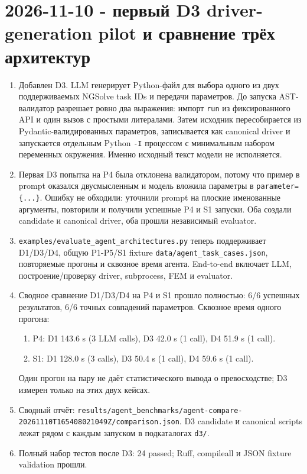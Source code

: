 \documentclass[11pt,a4paper]{article}
\begin{document}
\section{2026-11-10 - первый D3 driver-generation pilot и сравнение трёх архитектур}

\begin{enumerate}
    \item Добавлен D3. LLM генерирует Python-файл для выбора одного из двух поддерживаемых NGSolve task IDs и передачи параметров. До запуска AST-валидатор разрешает ровно два выражения: импорт \texttt{run} из фиксированного API и один вызов с простыми литералами. Затем исходник пересобирается из Pydantic-валидированных параметров, записывается как canonical driver и запускается отдельным Python \texttt{-I} процессом с минимальным набором переменных окружения. Именно исходный текст модели не исполняется.
    \item Первая D3 попытка на P4 была отклонена валидатором, потому что пример в prompt оказался двусмысленным и модель вложила параметры в \texttt{parameter=\{...\}}. Ошибку не обходили: уточнили prompt на плоские именованные аргументы, повторили и получили успешные P4 и S1 запуски. Оба создали candidate и canonical driver, оба прошли независимый evaluator.
    \item \texttt{examples/evaluate\_agent\_architectures.py} теперь поддерживает D1/D3/D4, общую P1-P5/S1 fixture \texttt{data/agent\_task\_cases.json}, повторяемые прогоны и сквозное время агента. End-to-end включает LLM, построение/проверку driver, subprocess, FEM и evaluator.
    \item Сводное сравнение D1/D3/D4 на P4 и S1 прошло полностью: 6/6 успешных результатов, 6/6 точных совпадений параметров. Сквозное время одного прогона:
    \begin{enumerate}
        \item P4: D1 143.6 s (3 LLM calls), D3 42.0 s (1 call), D4 51.9 s (1 call).
        \item S1: D1 128.0 s (3 calls), D3 50.4 s (1 call), D4 59.6 s (1 call).
    \end{enumerate}
    Один прогон на пару не даёт статистического вывода о превосходстве; D3 измерен только на этих двух кейсах.
    \item Сводный отчёт: \texttt{results/agent\_benchmarks/agent-compare-20261110T165408021049Z/comparison.json}. D3 candidate и canonical scripts лежат рядом с каждым запуском в подкаталогах \texttt{d3/}.
    \item Полный набор тестов после D3: 24 passed; Ruff, compileall и JSON fixture validation прошли.
\end{enumerate}
\end{document}
